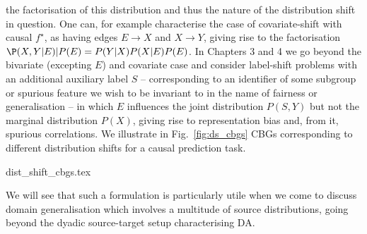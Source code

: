 the factorisation of this distribution and thus the nature of the distribution shift in question.
%
One can, for example characterise the case of covariate-shift with causal \(f^\star\), as having
edges  \(E \to X\) and \( X \to Y \), giving rise to the factorisation \( \P(X, Y | E) | P(E) =
P(Y|X)P(X|E)P(E) \). 
%
In Chapters 3 and 4 we go beyond the bivariate (excepting \( E \)) and covariate case and consider
label-shift problems with an additional auxiliary label \(S\) -- corresponding to an identifier of
some subgroup or spurious feature we wish to be invariant to in the name of fairness or
generalisation --  in which \(E\) influences the joint distribution \( P(S, Y) \) but not the
marginal distribution \(P(X)\), giving rise to representation bias and, from it, spurious
correlations.
%
We illustrate in Fig.~\ref{fig:ds_cbgs} CBGs corresponding to different distribution shifts for a
causal prediction task.
%

{dist_shift_cbgs.tex}

%
We will see that such a formulation is particularly utile when we come to discuss domain
generalisation which involves a multitude of source distributions, going beyond the dyadic
source-target setup characterising DA.

